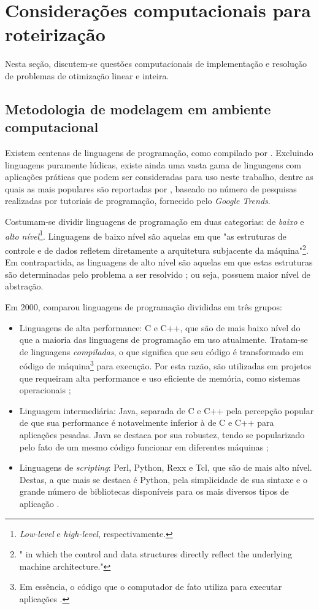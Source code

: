 \section{Considerações computacionais para roteirização}\label{sec:considerações computacionais}
Nesta seção, discutem-se questões computacionais de implementação e resolução de problemas de otimização linear e inteira.

\subsection{Metodologia de modelagem em ambiente computacional}
Existem centenas de linguagens de programação, como compilado por \textcite{SCHADE:23}. Excluindo linguagens puramente lúdicas, existe ainda uma vasta gama de linguagens com aplicações práticas que podem ser consideradas para uso neste trabalho, dentre as quais as mais populares são reportadas por \textcite{CARBONNELLE:23}, baseado no número de pesquisas realizadas por tutoriais de programação, fornecido pelo \emph{Google Trends}.

Costumam-se dividir linguagens de programação em duas categorias: de \emph{baixo} e \emph{alto nível}\footnote{\emph{Low-level} e \emph{high-level}, respectivamente.}. Linguagens de baixo nível são aquelas em que "as estruturas de controle e de dados refletem diretamente a arquitetura subjacente da máquina"\footnote{"\textelp{} in which the control and data structures directly reflect the underlying machine architecture."}. Em contrapartida, as linguagens de alto nível são aquelas em que estas estruturas são determinadas pelo problema a ser resolvido \cite{BUTTERFIELD:16}; ou seja, possuem maior nível de abstração.

Em 2000, \textcite{PRECHELT:00} comparou linguagens de programação divididas em três grupos:

\begin{itemize}
    \item Linguagens de alta performance: C e C++, que são de mais baixo nível do que a maioria das linguagens de programação em uso atualmente. Tratam-se de linguagens \emph{compiladas}, o que significa que seu código é transformado em código de máquina\footnote{Em essência, o código que o computador de fato utiliza para executar aplicações \cite{BUTTERFIELD:16}.} para execução. Por esta razão, são utilizadas em projetos que requeiram alta performance e uso eficiente de memória, como sistemas operacionais \cite{TORVALDS:23,WAITE:09};
    \item Linguagem intermediária: Java, separada de C e C++ pela percepção popular de que sua performance é notavelmente inferior à de C e C++ para aplicações pesadas. Java se destaca por sua robustez, tendo se popularizado pelo fato de um mesmo código funcionar em diferentes máquinas \cite{RICARTE:00};
    \item Linguagens de \emph{scripting}: Perl, Python, Rexx e Tcl, que são de mais alto nível. Destas, a que mais se destaca é Python, pela simplicidade de sua sintaxe e o grande número de bibliotecas disponíveis para os mais diversos tipos de aplicação \cite{SRINATH:17}.
\end{itemize}

